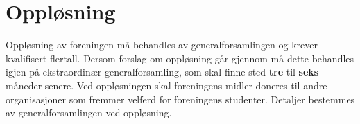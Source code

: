 \section{Oppløsning}
Oppløsning av foreningen må behandles av generalforsamlingen og krever kvalifisert flertall. 
Dersom forslag om oppløsning går gjennom må dette behandles igjen på ekstraordinær generalforsamling, 
som skal finne sted \textbf{tre} til \textbf{seks} måneder senere. 
Ved oppløsningen skal foreningens midler doneres til andre organisasjoner som fremmer velferd 
for foreningens studenter. Detaljer bestemmes av generalforsamlingen ved oppløsning.
